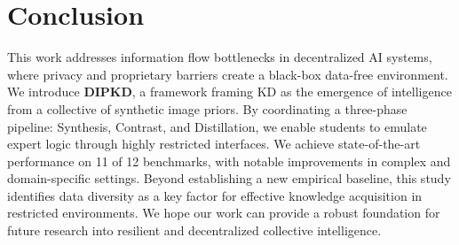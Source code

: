 \section{Conclusion} \label{sec:45-research02-conclusion}

\begin{foldable}
  This work addresses information flow bottlenecks in decentralized \ac{AI} systems, where privacy and proprietary barriers create a black-box data-free environment.
  We introduce \textbf{DIPKD}, a framework framing \ac{KD} as the emergence of intelligence from a collective of synthetic image priors.
  By coordinating a three-phase pipeline: Synthesis, Contrast, and Distillation, we enable students to emulate expert logic through highly restricted interfaces.
  We achieve state-of-the-art performance on 11 of 12 benchmarks, with notable improvements in complex and domain-specific settings.
  Beyond establishing a new empirical baseline, this study identifies data diversity as a key factor for effective knowledge acquisition in restricted environments.
  We hope our work can provide a robust foundation for future research into resilient and decentralized collective intelligence.
\end{foldable}
